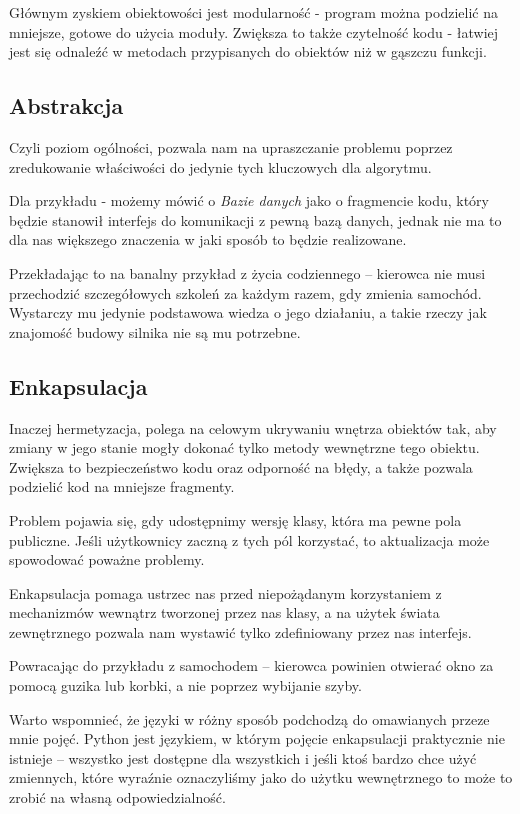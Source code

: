 Głównym zyskiem obiektowości jest modularność - program można podzielić na mniejsze, gotowe do użycia moduły. Zwiększa to także czytelność kodu - łatwiej jest się odnaleźć w metodach przypisanych do obiektów niż w gąszczu funkcji.

\subsection{Abstrakcja}
Czyli poziom ogólności, pozwala nam na upraszczanie problemu poprzez zredukowanie właściwości do jedynie tych kluczowych dla algorytmu.

Dla przykładu - możemy mówić o \textit{Bazie danych} jako o fragmencie kodu, który będzie stanowił interfejs do komunikacji z pewną bazą danych, jednak nie ma to dla nas większego znaczenia w jaki sposób to będzie realizowane.

Przekładając to na banalny przykład z życia codziennego -- kierowca nie musi przechodzić szczegółowych szkoleń za każdym razem, gdy zmienia samochód.
Wystarczy mu jedynie podstawowa wiedza o jego działaniu, a takie rzeczy jak znajomość budowy silnika nie są mu potrzebne.

\subsection{Enkapsulacja}
Inaczej hermetyzacja, polega na celowym ukrywaniu wnętrza obiektów tak, aby zmiany w jego stanie mogły dokonać tylko metody wewnętrzne tego obiektu. Zwiększa to bezpieczeństwo kodu oraz odporność na błędy, a także pozwala podzielić kod na mniejsze fragmenty.

Problem pojawia się, gdy udostępnimy wersję klasy, która ma pewne pola publiczne.
Jeśli użytkownicy zaczną z tych pól korzystać, to aktualizacja może spowodować poważne problemy.

Enkapsulacja pomaga ustrzec nas przed niepożądanym korzystaniem z mechanizmów wewnątrz tworzonej przez nas klasy, a na użytek świata zewnętrznego pozwala nam wystawić tylko zdefiniowany przez nas interfejs.

Powracając do przykładu z samochodem -- kierowca powinien otwierać okno za pomocą guzika lub korbki, a nie poprzez wybijanie szyby.

Warto wspomnieć, że języki w różny sposób podchodzą do omawianych przeze mnie pojęć.
Python jest językiem, w którym pojęcie enkapsulacji praktycznie nie istnieje -- wszystko jest dostępne dla wszystkich i jeśli ktoś bardzo chce użyć zmiennych, które wyraźnie oznaczyliśmy jako do użytku wewnętrznego to może to zrobić na własną odpowiedzialność.

